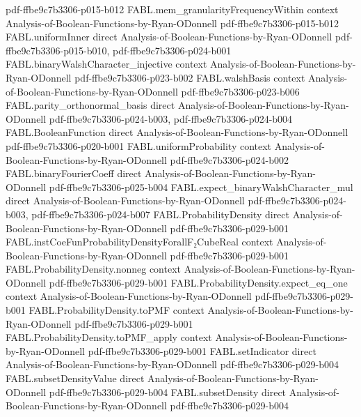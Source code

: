 \begin{theorem}
  {pdf-ffbe9c7b3306-p015-b012}
\proofstep
  {FABL.mem_granularityFrequencyWithin}
  {context}
  {Analysis-of-Boolean-Functions-by-Ryan-ODonnell}
  {pdf-ffbe9c7b3306-p015-b012}
\proofstep
  {FABL.uniformInner}
  {direct}
  {Analysis-of-Boolean-Functions-by-Ryan-ODonnell}
  {pdf-ffbe9c7b3306-p015-b010,
    pdf-ffbe9c7b3306-p024-b001}
\proofstep
  {FABL.binaryWalshCharacter_injective}
  {context}
  {Analysis-of-Boolean-Functions-by-Ryan-ODonnell}
  {pdf-ffbe9c7b3306-p023-b002}
\proofstep
  {FABL.walshBasis}
  {context}
  {Analysis-of-Boolean-Functions-by-Ryan-ODonnell}
  {pdf-ffbe9c7b3306-p023-b006}
\proofstep
  {FABL.parity_orthonormal_basis}
  {direct}
  {Analysis-of-Boolean-Functions-by-Ryan-ODonnell}
  {pdf-ffbe9c7b3306-p024-b003,
    pdf-ffbe9c7b3306-p024-b004}
\proofstep
  {FABL.BooleanFunction}
  {direct}
  {Analysis-of-Boolean-Functions-by-Ryan-ODonnell}
  {pdf-ffbe9c7b3306-p020-b001}
\proofstep
  {FABL.uniformProbability}
  {context}
  {Analysis-of-Boolean-Functions-by-Ryan-ODonnell}
  {pdf-ffbe9c7b3306-p024-b002}
\proofstep
  {FABL.binaryFourierCoeff}
  {direct}
  {Analysis-of-Boolean-Functions-by-Ryan-ODonnell}
  {pdf-ffbe9c7b3306-p025-b004}
\proofstep
  {FABL.expect_binaryWalshCharacter_mul}
  {direct}
  {Analysis-of-Boolean-Functions-by-Ryan-ODonnell}
  {pdf-ffbe9c7b3306-p024-b003,
    pdf-ffbe9c7b3306-p024-b007}
\proofstep
  {FABL.ProbabilityDensity}
  {direct}
  {Analysis-of-Boolean-Functions-by-Ryan-ODonnell}
  {pdf-ffbe9c7b3306-p029-b001}
\proofstep
  {FABL.instCoeFunProbabilityDensityForallF₂CubeReal}
  {context}
  {Analysis-of-Boolean-Functions-by-Ryan-ODonnell}
  {pdf-ffbe9c7b3306-p029-b001}
\proofstep
  {FABL.ProbabilityDensity.nonneg}
  {context}
  {Analysis-of-Boolean-Functions-by-Ryan-ODonnell}
  {pdf-ffbe9c7b3306-p029-b001}
\proofstep
  {FABL.ProbabilityDensity.expect_eq_one}
  {context}
  {Analysis-of-Boolean-Functions-by-Ryan-ODonnell}
  {pdf-ffbe9c7b3306-p029-b001}
\proofstep
  {FABL.ProbabilityDensity.toPMF}
  {context}
  {Analysis-of-Boolean-Functions-by-Ryan-ODonnell}
  {pdf-ffbe9c7b3306-p029-b001}
\proofstep
  {FABL.ProbabilityDensity.toPMF_apply}
  {context}
  {Analysis-of-Boolean-Functions-by-Ryan-ODonnell}
  {pdf-ffbe9c7b3306-p029-b001}
\proofstep
  {FABL.setIndicator}
  {direct}
  {Analysis-of-Boolean-Functions-by-Ryan-ODonnell}
  {pdf-ffbe9c7b3306-p029-b004}
\proofstep
  {FABL.subsetDensityValue}
  {direct}
  {Analysis-of-Boolean-Functions-by-Ryan-ODonnell}
  {pdf-ffbe9c7b3306-p029-b004}
\proofstep
  {FABL.subsetDensity}
  {direct}
  {Analysis-of-Boolean-Functions-by-Ryan-ODonnell}
  {pdf-ffbe9c7b3306-p029-b004}
\proofstep

\end{theorem}
